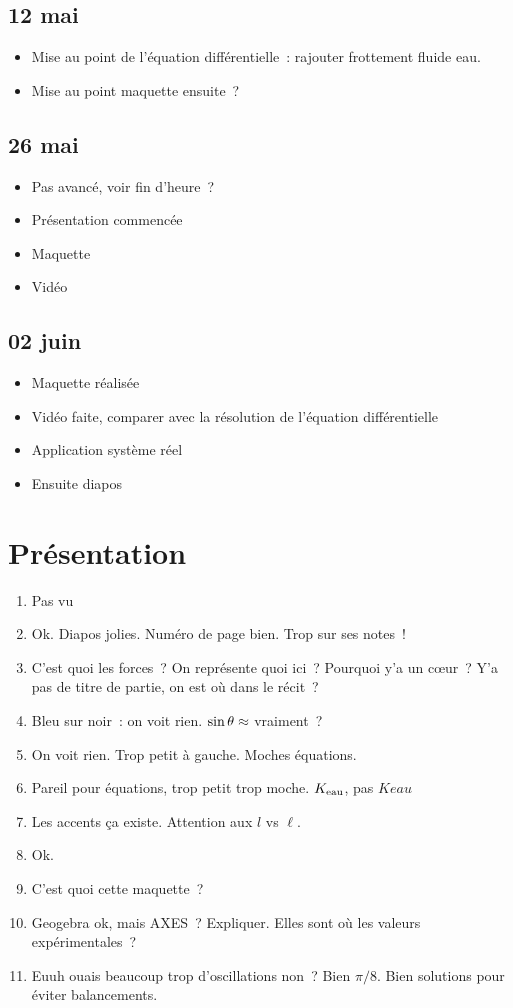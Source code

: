 \documentclass[a4paper, 11pt, final, garamond]{book}
\begin{document}
\subsection{12 mai}
\begin{itemize}
  \item Mise au point de l'équation différentielle~: rajouter frottement fluide
    eau.
  \item Mise au point maquette ensuite~?
\end{itemize}

\subsection{26 mai}
\begin{itemize}
  \item Pas avancé, voir fin d'heure~?
  \item Présentation commencée
  \item Maquette
  \item Vidéo
\end{itemize}

\subsection{02 juin}
\begin{itemize}
  \item Maquette réalisée
  \item Vidéo faite, comparer avec la résolution de l'équation différentielle
  \item Application système réel
  \item Ensuite diapos
\end{itemize}

\section{Présentation}

\begin{enumerate}
  \item Pas vu
  \item Ok. Diapos jolies. Numéro de page bien. Trop sur ses notes~!
  \item C'est quoi les forces~? On représente quoi ici~? Pourquoi y'a un cœur~?
    Y'a pas de titre de partie, on est où dans le récit~?
  \item Bleu sur noir~: on voit rien. $\sin{\theta} \approx \tt$ vraiment~?
  \item On voit rien. Trop petit à gauche. Moches équations.
  \item Pareil pour équations, trop petit trop moche. $K_{\rm eau}$, pas $Keau$
  \item Les accents ça existe. Attention aux $l$ vs $\ell $.
  \item Ok.
  \item C'est quoi cette maquette~?
  \item Geogebra ok, mais AXES~? Expliquer. Elles sont où les valeurs
    expérimentales~?
  \item Euuh ouais beaucoup trop d'oscillations non~? Bien $\pi/8$. Bien
    solutions pour éviter balancements.
\end{enumerate}
\end{document}
